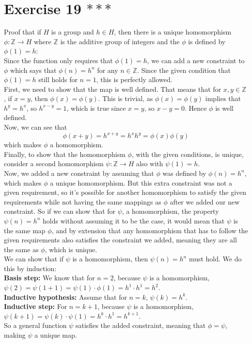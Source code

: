 \documentclass[12pt]{article}
\newcommand{\Z}{\mathbb{Z}}
\begin{document}
    \section*{Exercise 19 $***$}
    Proof that if $H$ is a group and $h \in H$,
    then there is a unique homomorphism $\phi: \Z \to H$
    where $\Z$ is the additive group of integers
    and the $\phi$ is defined by $\phi(1) = h$: \\
    Since the function only requires that $\phi(1) = h$,
    we can add a new constraint to $\phi$ which says that 
    $\phi(n) = h^n$ for any $n \in \Z$.
    Since the given condition that $\phi(1) = h$ still holds for $n = 1$,
    this is perfectly allowed. \\
    First, we need to show that the map is well defined.
    That means that for $x, y \in \Z$, if $x = y$,
    then $\phi(x) = \phi(y)$.
    This is trivial,
    as $\phi(x) = \phi(y)$ implies that $h^y = h^x$,
    so $h^{x - y} = 1$,
    which is true since $x = y$,
    so $x - y = 0$.
    Hence $\phi$ is well defined. \\
    Now, we can see that
    \[ \phi(x + y) = h^{x + y}
    = h^xh^y
    = \phi(x)\phi(y) \]
    which makes $\phi$ a homomorphism. \\
    Finally, to show that the homomorphism $\phi$, with the given conditions,
    is unique,
    consider a second homomorphism $\psi: \Z \to H$
    also with $\psi(1) = h$. \\
    Now, we added a new constraint by assuming that $\phi$ was
    defined by $\phi(n) = h^n$,
    which makes $\phi$ a unique homomorphism.
    But this extra constraint was not a given requirement,
    so it's possible for another homomorphism to satisfy
    the given requirements while not having the same mappings as $\phi$
    after we added our new constraint.
    So if we can show that for $\psi$, a homomorphism,
    the property $\psi(n) = h^n$ holds without assuming it to be the case,
    it would mean that $\psi$ is the same map $\phi$,
    and by extension that any homomorphism that has to follow the given
    requirements also satisfies the constraint we added,
    meaning they are all the same as $\phi$, which is unique. \\
    We can show that if $\psi$ is a homomorphism,
    then $\psi(n) = h^n$ must hold.
    We do this by induction: \\
    \textbf{Basis step:}
    We know that for $n = 2$,
    because $\psi$ is a homomorphism,
    $\psi(2) = \psi(1 + 1)
    = \psi(1) \cdot \phi(1) = h^1 \cdot h^1 = h^2$. \\
    \textbf{Inductive hypothesis:}
    Assume that for $n = k$, $\psi(k) = h^k$. \\ 
    \textbf{Inductive step:}
    For $n = k + 1$, because $\psi$ is a homomorphism,
    $\psi(k + 1) = \psi(k) \cdot \psi(1)
    = h^k \cdot h^1 = h^{k+1}$. \\
    So a general function $\psi$ satisfies the added constraint,
    meaning that $\phi = \psi$,
    making $\psi$ a unique map.
\end{document}
